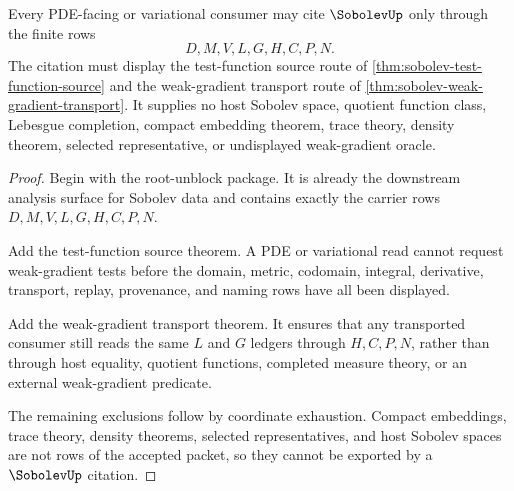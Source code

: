 \begin{theorem}
\label{thm:sobolev-pde-consumer-admission}
Every PDE-facing or variational consumer may cite $\SobolevUp$ only through the finite rows
$$
D,M,V,L,G,H,C,P,N .
$$
The citation must display the test-function source route of \autoref{thm:sobolev-test-function-source} and the weak-gradient transport route of \autoref{thm:sobolev-weak-gradient-transport}. It supplies no host Sobolev space, quotient function class, Lebesgue completion, compact embedding theorem, trace theory, density theorem, selected representative, or undisplayed weak-gradient oracle.
\end{theorem}
\begin{proof}
Begin with the root-unblock package. It is already the downstream analysis surface for Sobolev data and contains exactly the carrier rows $D,M,V,L,G,H,C,P,N$.

Add the test-function source theorem. A PDE or variational read cannot request weak-gradient tests before the domain, metric, codomain, integral, derivative, transport, replay, provenance, and naming rows have all been displayed.

Add the weak-gradient transport theorem. It ensures that any transported consumer still reads the same $L$ and $G$ ledgers through $H,C,P,N$, rather than through host equality, quotient functions, completed measure theory, or an external weak-gradient predicate.

The remaining exclusions follow by coordinate exhaustion. Compact embeddings, trace theory, density theorems, selected representatives, and host Sobolev spaces are not rows of the accepted packet, so they cannot be exported by a $\SobolevUp$ citation.
\end{proof}

